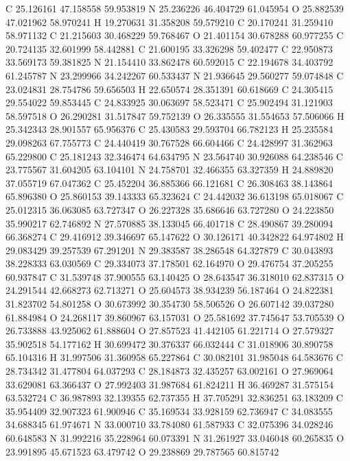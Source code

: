 \documentclass{article}
\begin{document}
C 25.126161 47.158558 59.953819 
N 25.236226 46.404729 61.045954 
O 25.882539 47.021962 58.970241 
H 19.270631 31.358208 59.579210 
C 20.170241 31.259410 58.971132 
C 21.215603 30.468229 59.768467 
O 21.401154 30.678288 60.977255 
C 20.724135 32.601999 58.442881 
C 21.600195 33.326298 59.402477 
C 22.950873 33.569173 59.381825 
N 21.154410 33.862478 60.592015 
C 22.194678 34.403792 61.245787 
N 23.299966 34.242267 60.533437 
N 21.936645 29.560277 59.074848 
C 23.024831 28.754786 59.656503 
H 22.650574 28.351391 60.618669 
C 24.305415 29.554022 59.853445 
C 24.833925 30.063697 58.523471 
C 25.902494 31.121903 58.597518 
O 26.290281 31.517847 59.752139 
O 26.335555 31.554653 57.506066 
H 25.342343 28.901557 65.956376 
C 25.430583 29.593704 66.782123 
H 25.235584 29.098263 67.755773 
C 24.440419 30.767528 66.604466 
C 24.428997 31.362963 65.229800 
C 25.181243 32.346474 64.634795 
N 23.564740 30.926088 64.238546 
C 23.775567 31.604205 63.104101 
N 24.758701 32.466355 63.327359 
H 24.889820 37.055719 67.047362 
C 25.452204 36.885366 66.121681 
C 26.308463 38.143864 65.896380 
O 25.860153 39.143333 65.323624 
C 24.442032 36.613198 65.018067 
C 25.012315 36.063085 63.727347 
O 26.227328 35.686646 63.727280 
O 24.223850 35.990217 62.746892 
N 27.570885 38.133045 66.401718 
C 28.490867 39.280094 66.368274 
C 29.416912 39.346697 65.147622 
O 30.126171 40.342822 64.974802 
H 29.083429 39.257539 67.291201 
N 29.383587 38.286548 64.327879 
C 30.043893 38.228333 63.030569 
C 29.334073 37.178501 62.164970 
O 29.476754 37.205255 60.937847 
C 31.539748 37.900555 63.140425 
O 28.643547 36.318010 62.837315 
O 24.291544 42.668273 62.713271 
O 25.604573 38.934239 56.187464 
O 24.822381 31.823702 54.801258 
O 30.673992 30.354730 58.506526 
O 26.607142 39.037280 61.884984 
O 24.268117 39.860967 63.157031 
O 25.581692 37.745647 53.705539 
O 26.733888 43.925062 61.888604 
O 27.857523 41.442105 61.221714 
O 27.579327 35.902518 54.177162 
H 30.699472 30.376337 66.032444 
C 31.018906 30.890758 65.104316 
H 31.997506 31.360958 65.227864 
C 30.082101 31.985048 64.583676 
C 28.734342 31.477804 64.037293 
C 28.184873 32.435257 63.002161 
O 27.969064 33.629081 63.366437 
O 27.992403 31.987684 61.824211 
H 36.469287 31.575154 63.532724 
C 36.987893 32.139355 62.737355 
H 37.705291 32.836251 63.183209 
C 35.954409 32.907323 61.900946 
C 35.169534 33.928159 62.736947 
C 34.083555 34.688345 61.974671 
N 33.000710 33.784080 61.587933 
C 32.075396 34.028246 60.648583 
N 31.992216 35.228964 60.073391 
N 31.261927 33.046048 60.265835 
O 23.991895 45.671523 63.479742 
O 29.238869 29.787565 60.815742 
\end{document}
